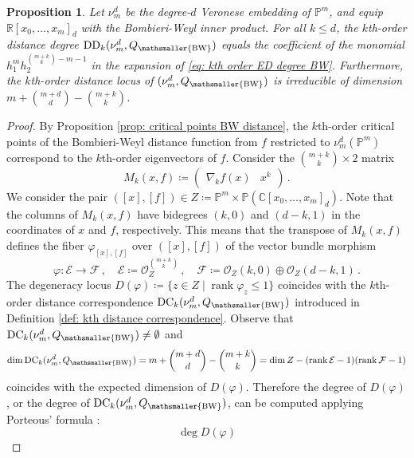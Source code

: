 \documentclass[11pt,reqno]{amsart}
\numberwithin{equation}{section}
\theoremstyle{plain}
\numberwithin{theorem}{section}
\newtheorem{proposition}[theorem]{Proposition}
\theoremstyle{definition}
\renewcommand{\P}{\mathbb{P}}
\newcommand{\R}{\mathbb{R}}
\newcommand{\C}{\mathbb{C}}
\newcommand{\EE}{\mathcal{E}}
\newcommand{\FF}{\mathcal{F}}
\newcommand{\OO}{\mathcal{O}}
\newcommand{\DC}{\operatorname{DC}}
\newcommand{\DD}{\operatorname{DD}}
\newcommand{\rank}{\operatorname{rank}}
\newcommand{\mBW}{\mathsmaller{\mathrm{BW}}}
\begin{document}
\begin{proposition}\label{prop: kth order ED degree BW}
Let $\nu_m^d$ be the degree-$d$ Veronese embedding of $\P^m$, and equip $\R[x_0,\dots,x_m]_d$ with the Bombieri-Weyl inner product. For all $k\le d$, the $k$th-order distance degree $\DD_k(\nu_m^d,Q_\mBW)$ equals the coefficient of the monomial $h_1^mh_2^{\binom{m+k}{k}-m-1}$ in the expansion of \eqref{eq: kth order ED degree BW}.
Furthermore, the $k$th-order distance locus of $(\nu_m^d,Q_\mBW)$ is irreducible of dimension $m+\binom{m+d}{d}-\binom{m+k}{k}$.
\end{proposition}
\begin{proof}
By Proposition \ref{prop: critical points BW distance}, the $k$th-order critical points of the Bombieri-Weyl distance function from $f$ restricted to $\nu_m^d(\P^m)$ correspond to the $k$th-order eigenvectors of $f$.
Consider the $\binom{m+k}{k}\times 2$ matrix
\begin{equation}\label{eq: matrix defining order-k eigenvectors}
M_k(x,f)\coloneqq
\begin{pmatrix}
    \nabla_k f(x) & x^k
\end{pmatrix}\,.
\end{equation}
We consider the pair $([x],[f])\in Z\coloneqq \P^m\times \P(\C[x_0,\dots,x_m]_d)$. Note that the columns of $M_k(x,f)$ have bidegrees $(k,0)$ and $(d-k,1)$ in the coordinates of $x$ and $f$, respectively. This means that the transpose of $M_k(x,f)$ defines the fiber $\varphi_{[x],[f]}$ over $([x],[f])$ of the vector bundle morphism
\begin{equation}\label{eq: morphism phi}
    \varphi\colon \EE\to\FF\,,\quad \EE \coloneqq \OO_Z^{\binom{m+k}{k}}\,,\quad \FF\coloneqq \OO_Z(k,0)\oplus\OO_Z(d-k,1)\,.
\end{equation}
The degeneracy locus $D(\varphi)\coloneqq\{z\in Z\mid \rank\varphi_z\le 1\}$ coincides with the $k$th-order distance correspondence $\DC_k(\nu_m^d,Q_\mBW)$ introduced in Definition \ref{def: kth distance correspondence}. Observe that $\DC_k(\nu_m^d,Q_\mBW)\neq\emptyset$ and
\begin{align*}
\dim \DC_k(\nu_m^d,Q_\mBW)= m+\binom{m+d}{d}-\binom{m+k}{k}= \dim Z-(\rank\EE-1)(\rank\FF-1)
\end{align*}
coincides with the expected dimension of $D(\varphi)$. Therefore the degree of $D(\varphi)$, or the degree of $\DC_k(\nu_m^d,Q_\mBW)$, can be computed applying Porteous' formula \cite[(4.2), p. 86]{arbarello1985geometry}:
\begin{equation}
\deg D(\varphi) 

\end{equation}
\end{proof}
\end{document}
